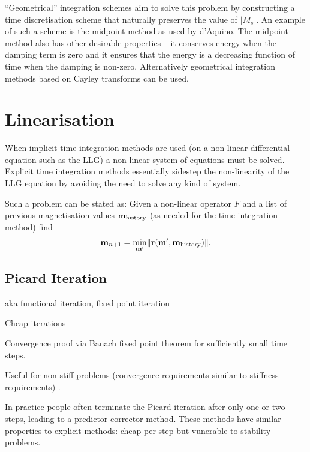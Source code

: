 
``Geometrical'' integration schemes aim to solve this problem by constructing a time discretisation scheme that naturally preserves the value of $|M_s|$. An example of such a scheme is the midpoint method as used by d'Aquino. The midpoint method also has other desirable properties -- it conserves energy when the damping term is zero and it ensures that the energy is a decreasing function of time when the damping is non-zero.\cite{DAquino2005} Alternatively geometrical integration methods based on Cayley transforms can be used.\cite{Lewis2003}\cite{Bottauscio2011}


\section{Linearisation}
\label{sec:linearisation}

When implicit time integration methods are used (on a non-linear differential equation such as the LLG) a non-linear system of equations must be solved.
Explicit time integration methods essentially sidestep the non-linearity of the LLG equation by avoiding the need to solve any kind of system.

Such a problem can be stated as:
Given a non-linear operator $F$ and a list of previous magnetisation values $\mathbf{m}_{\text{history}}$ (as needed for the time integration method) find
\begin{equation}
  \label{eq:non-lin-system}
  \mathbf{m}_{n+1} = \min_{\mathbf{m}'} \lVert \mathbf{r}(\mathbf{m}', \mathbf{m}_{\text{history}}) \rVert.
\end{equation}


\subsection{Picard Iteration}
\label{sec:picard}

aka functional iteration, fixed point iteration

Cheap iterations

Convergence proof via Banach fixed point theorem for sufficiently small time steps.

Useful for non-stiff problems (convergence requirements similar to stiffness requirements) \cite{Iserles2009}.

In practice people often terminate the Picard iteration after only one or two steps, leading to a predictor-corrector method. 
These methods have similar properties to explicit methods: cheap per step but vunerable to stability problems.


